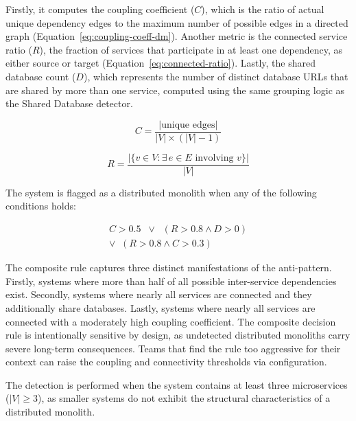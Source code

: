 \par Firstly, it computes the coupling coefficient ($C$), which is the ratio of actual unique dependency edges to the maximum number of possible edges in a directed graph (Equation~\ref{eq:coupling-coeff-dm}).
Another metric is the connected service ratio ($R$), the fraction of services that participate in at least one dependency, as either source or target (Equation~\ref{eq:connected-ratio}).
Lastly, the shared database count ($D$), which represents the number of distinct database URLs that are shared by more than one service, computed using the same grouping logic as the Shared Database detector.

\begin{equation}
    C = \frac{|\text{unique edges}|}{|V| \times (|V| - 1)}
    \label{eq:coupling-coeff-dm}
\end{equation}

\begin{equation}
    R = \frac{\bigl|\{v \in V : \exists\, e \in E \text{ involving } v\}\bigr|}{|V|}
    \label{eq:connected-ratio}
\end{equation}

The system is flagged as a distributed monolith when any of the following conditions holds:

\begin{equation}
    \begin{array}{c}
        C > 0.5 \;\;\vee\;\; (R > 0.8 \wedge D > 0) \\[4pt]
        \vee\;\; (R > 0.8 \wedge C > 0.3)
    \end{array}
    \label{eq:dm-decision-rule}
\end{equation}

The composite rule captures three distinct manifestations of the anti-pattern. Firstly, systems where more than half of all possible inter-service dependencies exist. Secondly, systems where nearly all services are connected and they additionally share databases. Lastly, systems where nearly all services are connected with a moderately high coupling coefficient. The composite decision rule is intentionally sensitive by design, as undetected distributed monoliths carry severe long-term consequences. Teams that find the rule too aggressive for their context can raise the coupling and connectivity thresholds via configuration.

The detection is performed when the system contains at least three microservices ($|V| \geq 3$), as smaller systems do not exhibit the structural characteristics of a distributed monolith.


